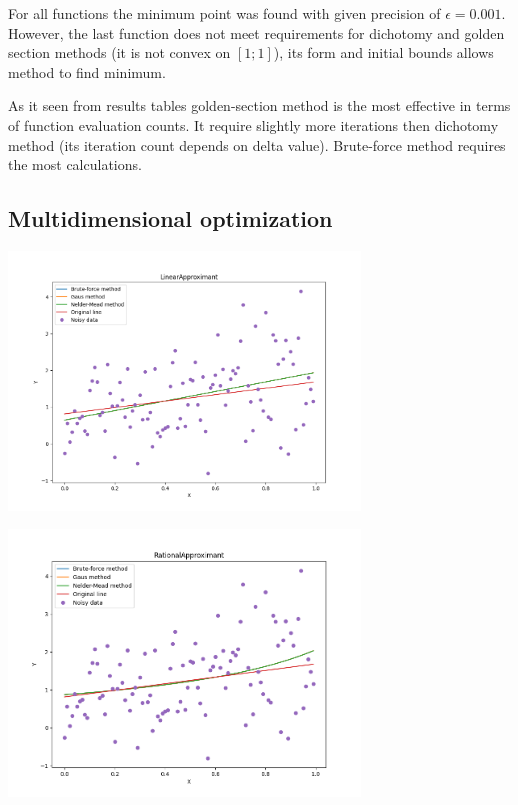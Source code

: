 For all functions the minimum point was found with given precision of $\epsilon = 0.001$. However, the last function does not meet requirements for
dichotomy and golden section methods (it is not convex on $[1;1]$), its form and initial bounds allows method to find minimum.

As it seen from results tables golden-section method is the most effective in terms of function evaluation counts. It require slightly more iterations then dichotomy method (its iteration count depends on delta value).
Brute-force method requires the most calculations.

\subsection*{Multidimensional optimization}

\begin{center}
    \includegraphics[width=0.7\textwidth]{../results/linear.png}
\end{center}

\begin{center}
    \includegraphics[width=0.7\textwidth]{../results/rational.png}
\end{center}

